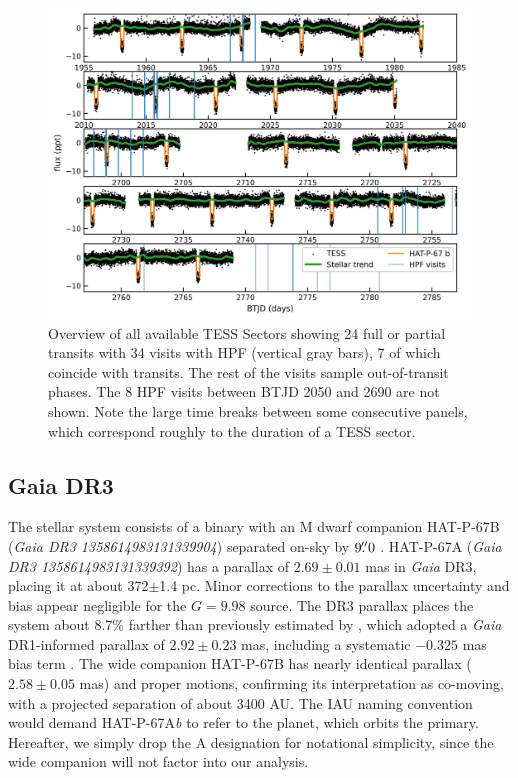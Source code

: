 \documentclass[twocolumn]{aastex631}
\begin{document}
\begin{figure}
    \centering
    \includegraphics[width=0.98\linewidth]{figures/TESS_HAT-P-67b_overview.png}
    \caption{Overview of all available TESS Sectors showing 24 full or partial transits with 34 visits with HPF (vertical gray bars), 7 of which coincide with transits.  The rest of the visits sample out-of-transit phases.  The 8 HPF visits between BTJD 2050 and 2690 are not shown.  Note the large time breaks between some consecutive panels, which correspond roughly to the duration of a TESS sector.}
    \label{fig:TESSoverview}
\end{figure}

\subsection{Gaia DR3}\label{gaiadr3}
The stellar system consists of a binary with an M dwarf companion HAT-P-67B (\emph{Gaia DR3 1358614983131339904}) separated on-sky by $9\mbox{$.\!\!^{\prime\prime}$}0$ \citep{2019MNRAS.490.5088M}.  HAT-P-67A (\emph{Gaia DR3 1358614983131339392}) has a parallax of $2.69\pm0.01$ mas in \emph{Gaia} DR3, placing it at about 372$\pm$1.4 pc.  Minor corrections to the parallax uncertainty \citep{2021MNRAS.506.2269E} and bias \citep{2021A&A...649A...4L} appear negligible for the $G=9.98$ source.  The DR3 parallax places the system about 8.7\% farther than previously estimated by \citet{2017AJ....153..211Z}, which adopted a \emph{Gaia} DR1-informed parallax of $2.92\pm0.23$ mas, including a systematic $-0.325$ mas bias term \citep{2016ApJ...831L...6S}.  The wide companion HAT-P-67B has nearly identical parallax ($2.58\pm0.05$ mas) and proper motions, confirming its interpretation as co-moving, with a projected separation of about 3400 AU.  The IAU naming convention would demand HAT-P-67A\emph{b} to refer to the planet, which orbits the primary.  Hereafter, we simply drop the A designation for notational simplicity, since the wide companion will not factor into our analysis.
\end{document}

